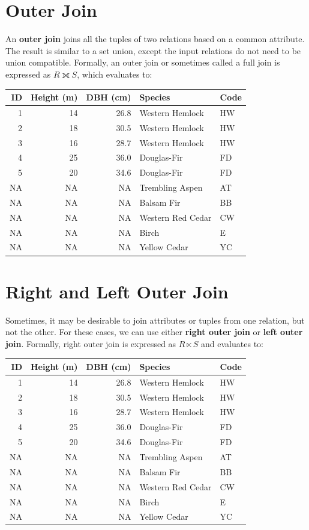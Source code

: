 \documentclass[
]{book}
\begin{document}
\section{Outer Join}\label{outer-join}

An \textbf{outer join} joins all the tuples of two relations based on a common attribute. The result is similar to a set union, except the input relations do not need to be union compatible. Formally, an outer join or sometimes called a full join is expressed as \(R⟗S\), which evaluates to:

\begin{tabular}{rrrll}
\toprule
ID & Height (m) & DBH (cm) & Species & Code\\
\midrule
1 & 14 & 26.8 & Western Hemlock & HW\\
2 & 18 & 30.5 & Western Hemlock & HW\\
3 & 16 & 28.7 & Western Hemlock & HW\\
4 & 25 & 36.0 & Douglas-Fir & FD\\
5 & 20 & 34.6 & Douglas-Fir & FD\\
\addlinespace
NA & NA & NA & Trembling Aspen & AT\\
NA & NA & NA & Balsam Fir & BB\\
NA & NA & NA & Western Red Cedar & CW\\
NA & NA & NA & Birch & E\\
NA & NA & NA & Yellow Cedar & YC\\
\bottomrule
\end{tabular}

\section{Right and Left Outer Join}\label{right-and-left-outer-join}

Sometimes, it may be desirable to join attributes or tuples from one relation, but not the other. For these cases, we can use either \textbf{right outer join} or \textbf{left outer join}. Formally, right outer join is expressed as \(R⋉S\) and evaluates to:

\begin{tabular}{rrrll}
\toprule
ID & Height (m) & DBH (cm) & Species & Code\\
\midrule
1 & 14 & 26.8 & Western Hemlock & HW\\
2 & 18 & 30.5 & Western Hemlock & HW\\
3 & 16 & 28.7 & Western Hemlock & HW\\
4 & 25 & 36.0 & Douglas-Fir & FD\\
5 & 20 & 34.6 & Douglas-Fir & FD\\
\addlinespace
NA & NA & NA & Trembling Aspen & AT\\
NA & NA & NA & Balsam Fir & BB\\
NA & NA & NA & Western Red Cedar & CW\\
NA & NA & NA & Birch & E\\
NA & NA & NA & Yellow Cedar & YC\\
\bottomrule
\end{tabular}
\end{document}

